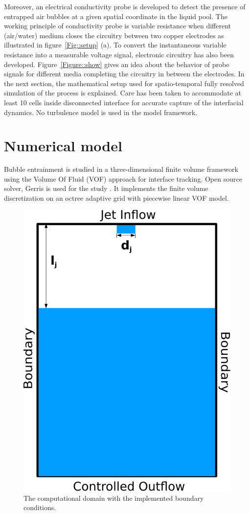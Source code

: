 Moreover, an electrical conductivity probe is developed to detect the presence of entrapped air bubbles at a given spatial coordinate in the liquid pool. The working principle of conductivity probe is variable resistance when different (air/water) medium closes the circuitry between two copper electrodes as illustrated in figure~\ref{Fig::setup} (a). To convert the instantaneous variable resistance into a measurable voltage signal, electronic circuitry has also been developed. Figure~\ref{Figure::show} gives an idea about the behavior of probe signals for different media completing the circuitry in between the electrodes. In the next section, the mathematical setup used for spatio-temporal fully resolved simulation of the process is explained. Care has been taken to accommodate at least 10 cells inside disconnected interface for accurate capture of the interfacial dynamics. No turbulence model is used in the model framework.
\section{Numerical model}
Bubble entrainment is studied in a three-dimensional finite volume framework using the Volume Of Fluid (VOF) approach for interface tracking. Open source solver, Gerris is used for the study \citep{Popinet2003}. It implements the finite volume discretization on an octree adaptive grid with piecewise linear VOF model. 
\begin{figure}
	\centering
	\includegraphics[width=0.5\linewidth]{chapters/jetPool/Figure3}
	\caption{The computational domain with the implemented boundary conditions.}
	\label{Figure::domain}
\end{figure}
